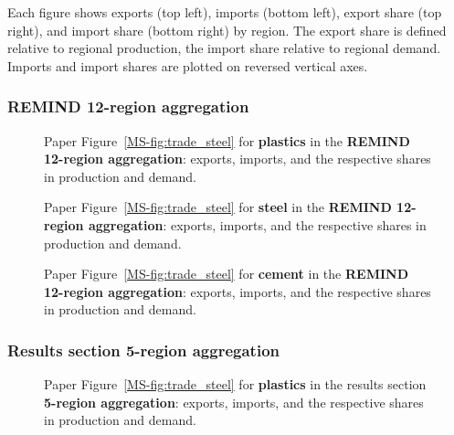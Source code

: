 Each figure shows exports (top left), imports (bottom left), export share (top right), and import share (bottom right) by region.
The export share is defined relative to regional production, the import share relative to regional demand.
Imports and import shares are plotted on reversed vertical axes.

\subsubsection{REMIND 12-region aggregation}

\begin{figure}[htbp]
    \centering
    \caption{Paper Figure~\ref{MS-fig:trade_steel} for \textbf{plastics} in the \textbf{REMIND 12-region aggregation}: exports, imports, and the respective shares in production and demand.}
    \label{fig:figure_10_plastics_h12}
\end{figure}

\begin{figure}[htbp]
    \centering
    \caption{Paper Figure~\ref{MS-fig:trade_steel} for \textbf{steel} in the \textbf{REMIND 12-region aggregation}: exports, imports, and the respective shares in production and demand.}
    \label{fig:figure_10_steel_h12}
\end{figure}

\begin{figure}[htbp]
    \centering
    \caption{Paper Figure~\ref{MS-fig:trade_steel} for \textbf{cement} in the \textbf{REMIND 12-region aggregation}: exports, imports, and the respective shares in production and demand.}
    \label{fig:figure_10_cement_h12}
\end{figure}

\clearpage
\subsubsection{Results section 5-region aggregation}

\begin{figure}[htbp]
    \centering
    \caption{Paper Figure~\ref{MS-fig:trade_steel} for \textbf{plastics} in the results section \textbf{5-region aggregation}: exports, imports, and the respective shares in production and demand.}
    \label{fig:figure_10_plastics_agg5}
\end{figure}

